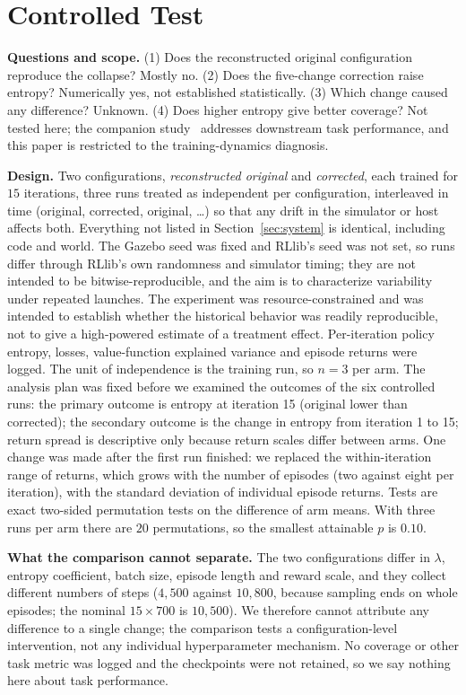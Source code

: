 \documentclass[12pt]{article}
\begin{document}
\section{Controlled Test}
\label{sec:test}
\textbf{Questions and scope.} (1) Does the reconstructed original configuration reproduce the collapse? Mostly no. (2) Does the five-change correction raise entropy? Numerically yes, not established statistically. (3) Which change caused any difference? Unknown. (4) Does higher entropy give better coverage? Not tested here; the companion study~\cite{pandhe2026mappo} addresses downstream task performance, and this paper is restricted to the training-dynamics diagnosis.

\textbf{Design.} Two configurations, \emph{reconstructed original} and
\emph{corrected}, each trained for $15$ iterations, three runs treated as independent
per configuration, interleaved in time (original, corrected, original, \dots)
so that any drift in the simulator or host affects both. Everything not
listed in Section~\ref{sec:system} is identical, including code and world.
The Gazebo seed was fixed and RLlib's seed was not set, so runs differ
through RLlib's own randomness and simulator timing; they are not intended to be bitwise-reproducible, and the aim is to characterize variability under repeated launches. The experiment was resource-constrained and was intended to establish whether the historical behavior was readily reproducible, not to give a high-powered estimate of a treatment effect. Per-iteration policy entropy, losses, value-function explained
variance and episode returns were logged. The unit of independence is the
training run, so $n=3$ per arm. The analysis plan was fixed before we examined the outcomes of the six controlled runs: the primary outcome is entropy at iteration 15 (original lower
than corrected); the secondary outcome is the change in entropy from
iteration 1 to 15; return spread is descriptive only because return scales
differ between arms. One change was made after the first run finished: we
replaced the within-iteration range of returns, which grows with the number
of episodes (two against eight per iteration), with the standard deviation of
individual episode returns. Tests are exact two-sided permutation tests on the difference
of arm means. With three runs per arm there are $20$ permutations, so the
smallest attainable $p$ is $0.10$.

\textbf{What the comparison cannot separate.} The two configurations differ
in $\lambda$, entropy coefficient, batch size, episode length and reward
scale, and they collect different numbers of steps ($4{,}500$ against
$10{,}800$, because sampling ends on whole episodes; the nominal $15\times700$
is $10{,}500$). We therefore cannot attribute any difference to a single
change; the comparison tests a configuration-level intervention, not any individual hyperparameter mechanism. No coverage or other task metric was logged and the checkpoints were
not retained, so we say nothing here about task performance.
\end{document}
